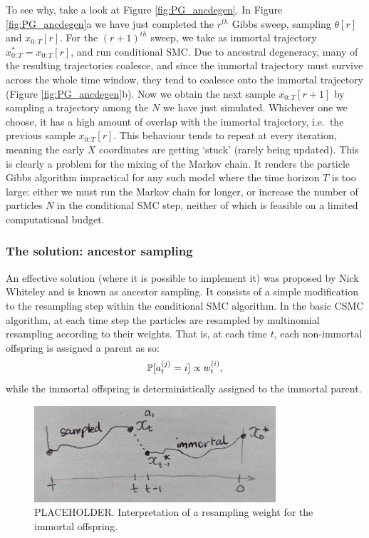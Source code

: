 To see why, take a look at Figure \ref{fig:PG_ancdegen}. In Figure \ref{fig:PG_ancdegen}a we have just completed the $r^{th}$ Gibbs sweep, sampling $\theta[r]$ and $x_{0:T}[r]$. For the $(r+1)^{th}$ sweep, we take as immortal trajectory $x_{0:T}^* = x_{0:T}[r]$, and run conditional SMC. Due to ancestral degeneracy, many of the resulting trajectories coalesce, and since the immortal trajectory must survive across the whole time window, they tend to coalesce onto the immortal trajectory (Figure \ref{fig:PG_ancdegen}b). Now we obtain the next sample $x_{0:T}[r+1]$ by sampling a trajectory among the $N$ we have just simulated. Whichever one we choose, it has a high amount of overlap with the immortal trajectory, i.e.\ the previous sample $x_{0:T}[r]$. This behaviour tends to repeat at every iteration, meaning the early $X$ coordinates are getting `stuck' (rarely being updated). This is clearly a problem for the mixing of the Markov chain.
It renders the particle Gibbs algorithm impractical for any such model where the time horizon $T$ is too large: either we must run the Markov chain for longer, or increase the number of particles $N$ in the conditional SMC step, neither of which is feasible on a limited computational budget. 


\subsubsection{The solution: ancestor sampling}

An effective solution (where it is possible to implement it) was proposed by Nick Whiteley and is known as ancestor sampling.
It consists of a simple modification to the resampling step within the conditional SMC algorithm. 
In the basic CSMC algorithm, at each time step the particles are resampled by multinomial resampling according to their weights. That is, at each time $t$, each non-immortal offspring is assigned a parent as so:
\begin{equation*}
\mathbb{P}[a_t^{(j)} = i] \propto w_t^{(i)} ,
\end{equation*}
while the immortal offspring is deterministically assigned to the immortal parent.

\begin{figure}
\centering
\includegraphics[width=0.8\textwidth]{plots/immresample.jpg}
\caption{PLACEHOLDER. Interpretation of a resampling weight for the immortal offspring.}
\label{fig:resample_immortal}
\end{figure}

